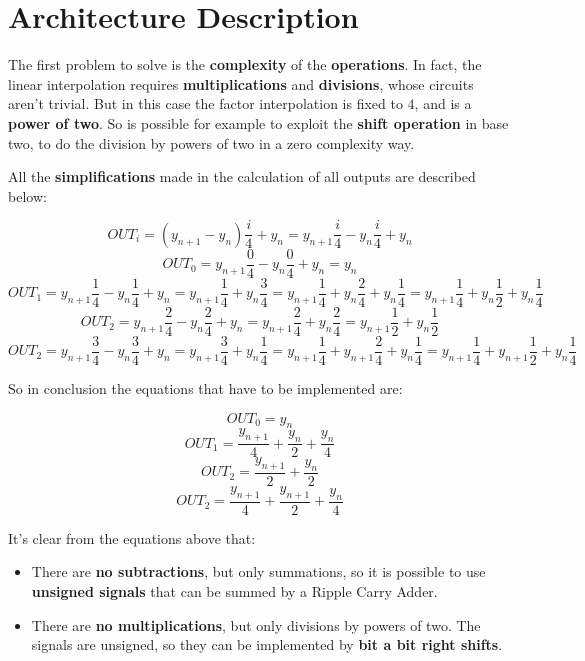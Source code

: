 \section{Architecture Description}

The first problem to solve is the \textbf{complexity} of the \textbf{operations}. In fact, the linear interpolation requires \textbf{multiplications} and \textbf{divisions}, whose circuits aren't trivial. But in this case the factor interpolation is fixed to $4$, and is a \textbf{power of two}. So is possible for example to exploit the \textbf{shift operation} in base two, to do the division by powers of two in a zero complexity way.

All the \textbf{simplifications} made in the calculation of all outputs are described below:

\[OUT_i = (y_{n+1} - y_n)\frac{i}{4} + y_n = y_{n+1} \frac{i}{4} - y_n \frac{i}{4} + y_n\] 
\[OUT_0 = y_{n+1} \frac{0}{4} - y_n \frac{0}{4} + y_n = y_n\] 
\[OUT_1 = y_{n+1} \frac{1}{4} - y_n \frac{1}{4} + y_n = y_{n+1} \frac{1}{4} + y_n \frac{3}{4} =  y_{n+1} \frac{1}{4} + y_n \frac{2}{4} + y_n \frac{1}{4} = y_{n+1} \frac{1}{4} + y_n \frac{1}{2} + y_n \frac{1}{4}\]
\[OUT_2 = y_{n+1} \frac{2}{4} - y_n \frac{2}{4} + y_n = y_{n+1} \frac{2}{4} + y_n \frac{2}{4} = y_{n+1} \frac{1}{2} + y_n \frac{1}{2}\] 
\[OUT_2 = y_{n+1} \frac{3}{4} - y_n \frac{3}{4} + y_n = y_{n+1} \frac{3}{4} + y_n \frac{1}{4} =  y_{n+1} \frac{1}{4} + y_{n+1} \frac{2}{4} + y_n \frac{1}{4} = y_{n+1} \frac{1}{4} + y_{n+1} \frac{1}{2} + y_n \frac{1}{4}\]

So in conclusion the equations that have to be implemented are:

\[OUT_0 =  y_n\] 
\[OUT_1 = \frac{y_{n+1}}{4} + \frac{y_n}{2} + \frac{y_n}{4}\]
\[OUT_2 = \frac{y_{n+1}}{2} + \frac{y_n}{2}\] 
\[OUT_2 = \frac{y_{n+1}}{4} + \frac{y_{n+1}}{2} + \frac{y_n}{4}\]

It's clear from the equations above that:

\begin{itemize}
    \item There are \textbf{no subtractions}, but only summations, so it is possible to use \textbf{unsigned signals} that can be summed by a Ripple Carry Adder.   
    \item There are \textbf{no multiplications}, but only divisions by powers of two. The signals are unsigned, so they can be implemented by \textbf{bit a bit right shifts}.
\end{itemize}

